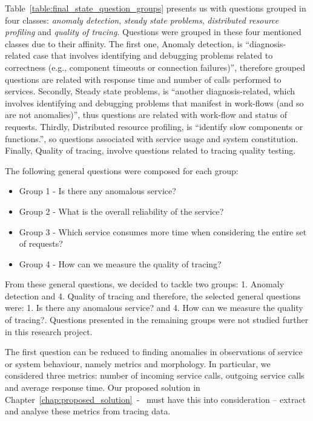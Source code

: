 Table~\ref{table:final_state_question_groups} presents us with questions grouped in four classes: \emph{anomaly detection}, \emph{steady state problems}, \emph{distributed resource profiling} and \emph{quality of tracing}. Questions were grouped in these four mentioned classes due to their affinity. The first one, Anomaly detection, is ``diagnosis-related case that involves identifying and debugging problems related to correctness (e.g., component timeouts or connection failures)'', therefore grouped questions are related with response time and number of calls performed to services. Secondly, Steady state problems, is ``another diagnosis-related, which involves identifying
and debugging problems that manifest in work-flows (and so are not anomalies)'', thus questions are related with work-flow and status of requests. Thirdly, Distributed resource profiling, is ``identify slow components or functions.'', so questions associated with service usage and system constitution. Finally, Quality of tracing, involve questions related to tracing quality testing.

The following general questions were composed for each group:

\begin{itemize}
    \item Group 1 - Is there any anomalous service?
    \item Group 2 - What is the overall reliability of the service?
    \item Group 3 - Which service consumes more time when considering the entire set of requests?
    \item Group 4 - How can we measure the quality of tracing?
\end{itemize}

\newpage

From these general questions, we decided to tackle two groups: 1. Anomaly detection and 4. Quality of tracing and therefore, the selected general questions were: 1. Is there any anomalous service? and 4. How can we measure the quality of tracing?. Questions presented in the remaining groups were not studied further in this research project.

The first question can be reduced to finding anomalies in observations of service or system behaviour, namely metrics and morphology.
In particular, we considered three metrics: number of incoming service calls, outgoing service calls and average response time. Our proposed solution in Chapter~\ref{chap:proposed_solution}~-~ must have this into consideration -- extract and analyse these metrics from tracing data.

